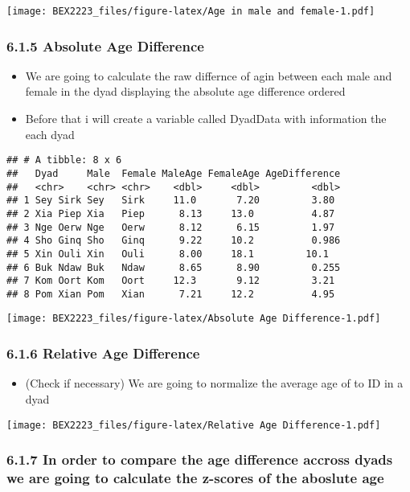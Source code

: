 \documentclass[
]{article}
\providecommand{\tightlist}{%
  \setlength{\itemsep}{0pt}\setlength{\parskip}{0pt}}
\begin{document}
\texttt{[image: BEX2223\_files/figure-latex/Age in male and female-1.pdf]}

\hypertarget{absolute-age-difference}{%
\subsubsection{6.1.5 Absolute Age
Difference}\label{absolute-age-difference}}

\begin{itemize}
\item
  We are going to calculate the raw differnce of agin between each male
  and female in the dyad displaying the absolute age difference ordered
\item
  Before that i will create a variable called DyadData with information
  the each dyad
\end{itemize}

\begin{verbatim}
## # A tibble: 8 x 6
##   Dyad     Male  Female MaleAge FemaleAge AgeDifference
##   <chr>    <chr> <chr>    <dbl>     <dbl>         <dbl>
## 1 Sey Sirk Sey   Sirk     11.0       7.20         3.80 
## 2 Xia Piep Xia   Piep      8.13     13.0          4.87 
## 3 Nge Oerw Nge   Oerw      8.12      6.15         1.97 
## 4 Sho Ginq Sho   Ginq      9.22     10.2          0.986
## 5 Xin Ouli Xin   Ouli      8.00     18.1         10.1  
## 6 Buk Ndaw Buk   Ndaw      8.65      8.90         0.255
## 7 Kom Oort Kom   Oort     12.3       9.12         3.21 
## 8 Pom Xian Pom   Xian      7.21     12.2          4.95
\end{verbatim}

\texttt{[image: BEX2223\_files/figure-latex/Absolute Age Difference-1.pdf]}

\hypertarget{relative-age-difference}{%
\subsubsection{6.1.6 Relative Age
Difference}\label{relative-age-difference}}

\begin{itemize}
\tightlist
\item
  (Check if necessary) We are going to normalize the average age of to
  ID in a dyad
\end{itemize}

\texttt{[image: BEX2223\_files/figure-latex/Relative Age Difference-1.pdf]}

\hypertarget{in-order-to-compare-the-age-difference-accross-dyads-we-are-going-to-calculate-the-z-scores-of-the-aboslute-age}{%
\subsubsection{6.1.7 In order to compare the age difference accross
dyads we are going to calculate the z-scores of the aboslute
age}\label{in-order-to-compare-the-age-difference-accross-dyads-we-are-going-to-calculate-the-z-scores-of-the-aboslute-age}}
\end{document}
